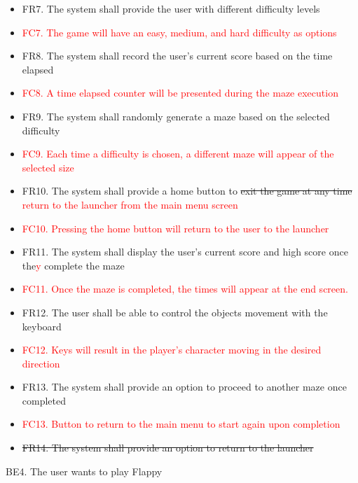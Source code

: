 \documentclass[12pt, titlepage]{article}
\begin{document}
    \begin{itemize}
        \item FR7. The system shall provide the user with different difficulty levels
        \item \textcolor{red}{FC7. The game will have an easy, medium, and hard difficulty as options}
        \item FR8. The system shall record the user’s current score based on the time elapsed
        \item \textcolor{red}{FC8. A time elapsed counter will be presented during the maze execution}
        \item FR9. The system shall randomly generate a maze based on the selected difficulty
        \item \textcolor{red}{FC9. Each time a difficulty is chosen, a different maze will appear of the selected size}
        \item FR10. The system shall provide a home button to \sout{exit the game at any time} \textcolor{red}{return to the launcher from the main menu screen}
        \item \textcolor{red}{FC10. Pressing the home button will return to the user to the launcher}
        \item FR11. The system shall display the user’s current score and high score once the\textcolor{red}{y} complete the maze
        \item \textcolor{red}{FC11. Once the maze is completed, the times will appear at the end screen.}
        \item FR12. The user shall be able to control the objects movement with the keyboard
        \item \textcolor{red}{FC12. Keys will result in the player's character moving in the desired direction}
        \item FR13. The system shall provide an option to proceed to another maze once completed
        \item \textcolor{red}{FC13. Button to return to the main menu to start again upon completion}
        \item \sout{FR14. The system shall provide an option to return to the launcher}
    \end{itemize}
    BE4. The user wants to play Flappy
\end{document}
